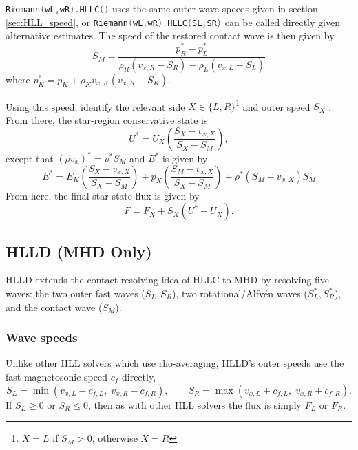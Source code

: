 \documentclass[11pt]{report}
\newcommand{\cpp}[1]{\lstinline[language=C++]{#1}}
\begin{document}
 \cpp{Riemann(wL,wR).HLLC()} uses the same outer wave speeds given in section \ref{sec:HLL_speed}, or \cpp{Riemann(wL,wR).HLLC(SL,SR)} can be called directly given alternative estimates. The speed of the restored contact wave is then given by
 \begin{equation}  S_M = \frac{p_R^{*} - p_L^{*}}{\rho_R(v_{x,R} - S_R) - \rho_L(v_{x,L} - S_L)} \end{equation}
where $p_K^{*} = p_K + \rho_K v_{x,K}(v_{x,K} - S_K)$.

Using this speed, identify the relevant side $X \in \{L, R\}$\footnote{$X=L$ if $S_M > 0$, otherwise $X=R$} and outer speed $S_X$ .  
From there, the star-region conservative state is
\begin{equation} U^{*} = U_X \left( \frac{S_X - v_{x,X}}{S_X - S_M}\right),\end{equation}
except that $(\rho v_x)^{*} = \rho^{*} S_M$ and  $E^*$ is given by
\begin{equation}
E^* = E_K \left(\frac{S_X - v_{x,X}}{S_X - S_M}\right)+  p_X\left(\frac{S_M - v_{x,X}}{S_X-S_M}\right)  + \rho^{*}(S_M - v_{x,X})S_M 
\end{equation}
From here, the final star-state flux is given by 
\begin{equation}
F = F_X + S_X(U^{*} - U_X).
\end{equation}

\subsection{HLLD (MHD Only)} \label{sec:HLLD}

HLLD \citep{MiyoshiKusano2005} extends the contact-resolving idea of HLLC to MHD by resolving five waves: the two outer fast waves ($S_L,
S_R$), two rotational/Alfv\'en waves ($S_L^{*}, S_R^{*}$), and the contact wave ($S_M$).

\subsubsection{Wave speeds}
Unlike other HLL solvers which use rho-averaging, HLLD's outer speeds use the fast magnetosonic speed $c_f$ directly,
\begin{equation}
S_L = \min(v_{x,L} - c_{f,L},\; v_{x,R} - c_{f,R}), \qquad
S_R = \max(v_{x,L} + c_{f,L},\; v_{x,R} + c_{f,R}).
\end{equation}
If $S_L \ge 0$ or $S_R \le 0$, then as with other HLL solvers the flux is simply $F_L$ or $F_R$.
\end{document}
